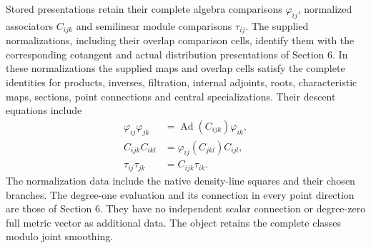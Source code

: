 \documentclass[
  english,
  11pt,
  reqno]{amsart}
\begin{document}
Stored presentations retain their complete algebra comparisons
\(\varphi_{ij}\), normalized associators \(C_{ijk}\) and semilinear
module comparisons \(\tau_{ij}\). The supplied normalizations, including
their overlap comparison cells, identify them with the corresponding
cotangent and actual distribution presentations of Section 6. In these
normalizations the supplied maps and overlap cells satisfy the complete
identities for products, inverses, filtration, internal adjoints, roots,
characteristic maps, sections, point connections and central
specializations. Their descent equations include%
 \[
\begin{aligned}
\varphi_{ij}\varphi_{jk}&=\operatorname{Ad}(C_{ijk})\varphi_{ik},\\
C_{ijk}C_{ikl}&=\varphi_{ij}(C_{jkl})C_{ijl},\\
\tau_{ij}\tau_{jk}&=C_{ijk}\tau_{ik}.
\end{aligned}
\] The normalization data include the native density-line squares and
their chosen branches. The degree-one evaluation and its connection in
every point direction are those of Section 6. They have no independent
scalar connection or degree-zero full metric vector as additional data.
The object retains the complete classes modulo joint smoothing.
\end{document}
